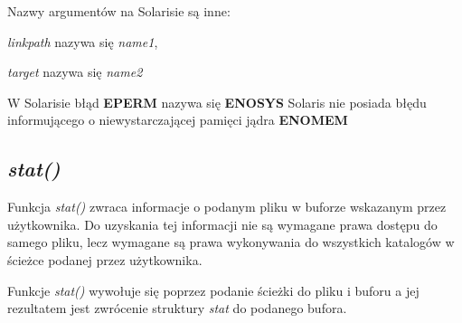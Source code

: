 \documentclass{article}
\begin{document}
Nazwy argumentów na Solarisie są inne:

\textit{linkpath} nazywa się \textit{name1},

\textit{target} nazywa się \textit{name2}

W Solarisie  błąd \textbf{EPERM} nazywa się \textbf{ENOSYS}
Solaris nie posiada błędu informującego o niewystarczającej pamięci jądra \textbf{ENOMEM}


\subsection{\textit{stat()}}

Funkcja\textit{ stat()} zwraca informacje o podanym pliku w buforze wskazanym przez użytkownika. 
Do uzyskania tej informacji nie są wymagane prawa dostępu do samego pliku, lecz wymagane są prawa wykonywania do wszystkich katalogów w ścieżce podanej przez użytkownika. 

Funkcje\textit{ stat()} wywołuje się poprzez podanie ścieżki do pliku i buforu a jej rezultatem jest zwrócenie struktury \textit{stat} do podanego bufora. 
\end{document}
